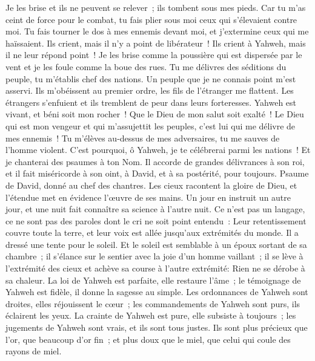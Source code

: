 \begin{multicols}{2}
Je les brise et ils ne peuvent se relever~; ils tombent sous mes pieds.
Car tu m'as ceint de force pour le combat, tu fais plier sous moi ceux qui s'élevaient contre moi.
Tu fais tourner le dos à mes ennemis devant moi, et j'extermine ceux qui me haïssaient.
Ils crient, mais il n'y a point de libérateur~! Ils crient à Yahweh, mais il ne leur répond point~!
Je les brise comme la poussière qui est dispersée par le vent et je les foule comme la boue des rues.
Tu me délivres des séditions du peuple, tu m'établis chef des nations. Un peuple que je ne connais point m'est asservi.
Ils m'obéissent au premier ordre, les fils de l'étranger me flattent.
Les étrangers s'enfuient et ils tremblent de peur dans leurs forteresses.
Yahweh est vivant, et béni soit mon rocher~! Que le Dieu de mon salut soit exalté~!
Le Dieu qui est mon vengeur et qui m'assujettit les peuples,
c'est lui qui me délivre de mes ennemis~! Tu m'élèves au-dessus de mes adversaires, tu me sauves de l'homme violent.
C'est pourquoi, ô Yahweh, je te célébrerai parmi les nations~! Et je chanterai des psaumes à ton Nom.
Il accorde de grandes délivrances à son roi, et il fait miséricorde à son oint, à David, et à sa postérité, pour toujours.
\VerseOne{}Psaume de David, donné au chef des chantres.
Les cieux racontent la gloire de Dieu, et l'étendue met en évidence l'œuvre de ses mains.
Un jour en instruit un autre jour, et une nuit fait connaître sa science à l'autre nuit.
Ce n'est pas un langage, ce ne sont pas des paroles dont le cri ne soit point entendu~:
Leur retentissement couvre toute la terre, et leur voix est allée jusqu'aux extrémités du monde. Il a dressé une tente pour le soleil.
Et le soleil est semblable à un époux sortant de sa chambre~; il s'élance sur le sentier avec la joie d'un homme vaillant~;
il se lève à l'extrémité des cieux et achève sa course à l'autre extrémité: Rien ne se dérobe à sa chaleur.
La loi de Yahweh est parfaite, elle restaure l'âme~; le témoignage de Yahweh est fidèle, il donne la sagesse au simple.
Les ordonnances de Yahweh sont droites, elles réjouissent le cœur~; les commandements de Yahweh sont purs, ils éclairent les yeux.
La crainte de Yahweh est pure, elle subsiste à toujours~; les jugements de Yahweh sont vrais, et ils sont tous justes.
Ils sont plus précieux que l'or, que beaucoup d'or fin~; et plus doux que le miel, que celui qui coule des rayons de miel.

\end{multicols}
